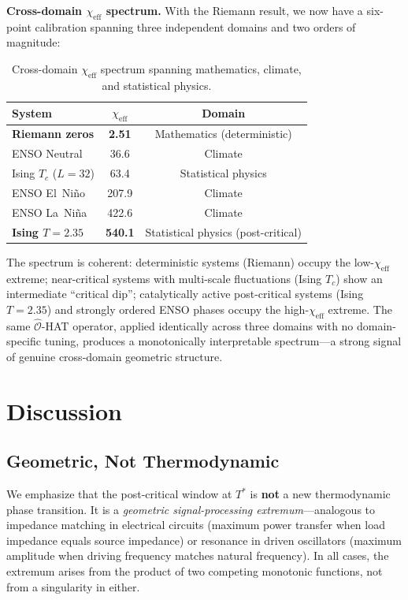 \documentclass[aps,prl,twocolumn,superscriptaddress,byrevtex]{article}
\begin{document}
\textbf{Cross-domain $\chi_{\text{eff}}$ spectrum.} With the Riemann result, we now have a six-point calibration spanning three independent domains and two orders of magnitude:

\begin{table}[h]
\centering
\caption{Cross-domain $\chi_{\text{eff}}$ spectrum spanning mathematics, climate, and statistical physics.}
\label{tab:crossdomain}
\begin{tabular}{lcc}
\toprule
System & $\chi_{\text{eff}}$ & Domain \\
\midrule
\textbf{Riemann zeros} & \textbf{2.51} & Mathematics (deterministic) \\
ENSO Neutral            & 36.6  & Climate \\
Ising $T_c$ ($L=32$)    & 63.4  & Statistical physics \\
ENSO El~Ni\~{n}o        & 207.9 & Climate \\
ENSO La~Ni\~{n}a        & 422.6 & Climate \\
\textbf{Ising $T=2.35$} & \textbf{540.1} & Statistical physics (post-critical) \\
\bottomrule
\end{tabular}
\end{table}

The spectrum is coherent: deterministic systems (Riemann) occupy the low-$\chi_{\text{eff}}$ extreme; near-critical systems with multi-scale fluctuations (Ising $T_c$) show an intermediate ``critical dip''; catalytically active post-critical systems (Ising $T=2.35$) and strongly ordered ENSO phases occupy the high-$\chi_{\text{eff}}$ extreme. The same $\hat{\mathcal{O}}$-HAT operator, applied identically across three domains with no domain-specific tuning, produces a monotonically interpretable spectrum---a strong signal of genuine cross-domain geometric structure.

\section{Discussion}

\subsection{Geometric, Not Thermodynamic}

We emphasize that the post-critical window at $T^*$ is \textbf{not} a new thermodynamic phase transition. It is a \emph{geometric signal-processing extremum}---analogous to impedance matching in electrical circuits (maximum power transfer when load impedance equals source impedance) or resonance in driven oscillators (maximum amplitude when driving frequency matches natural frequency). In all cases, the extremum arises from the product of two competing monotonic functions, not from a singularity in either.
\end{document}
